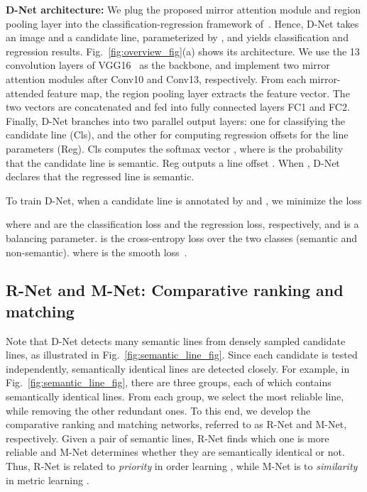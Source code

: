 \documentclass[runningheads]{llncs}
\begin{document}
\noindent\textbf{D-Net architecture:} We plug the proposed mirror attention module and region pooling layer into the classification-regression framework of~\cite{lee2017}. Hence, D-Net takes an image and a candidate line, parameterized by , and yields classification and regression results. Fig.~\ref{fig:overview_fig}(a) shows its architecture. We use the 13 convolution layers of VGG16~\cite{Simonyan2015} as the backbone, and implement two mirror attention modules after Conv10 and Conv13, respectively. From each mirror-attended feature map, the region pooling layer extracts the feature vector. The two vectors are concatenated and fed into fully connected layers FC1 and FC2. Finally, D-Net branches into two parallel output layers: one for classifying the candidate line (Cls), and the other for computing regression offsets for the line parameters (Reg). Cls computes the softmax vector , where  is the probability that the candidate line  is semantic. Reg outputs a line offset . When , D-Net declares that the regressed line  is semantic.

To train D-Net, when a candidate line is annotated by  and , we minimize the loss

where  and  are the classification loss and the regression loss, respectively, and  is a balancing parameter.  is the cross-entropy loss over the two classes (semantic and non-semantic).  where  is the smooth  loss~\cite{girshick2015fast}.


\subsection{R-Net and M-Net: Comparative ranking and matching}
\label{ssec:CRM}

Note that D-Net detects many semantic lines from densely sampled candidate lines, as illustrated in Fig.~\ref{fig:semantic_line_fig}. Since each candidate is tested independently, semantically identical lines are detected closely. For example, in Fig.~\ref{fig:semantic_line_fig}, there are three groups, each of which contains semantically identical lines. From each group, we select the most reliable line, while removing the other redundant ones. To this end, we develop the comparative ranking and matching networks, referred to as R-Net and M-Net, respectively. Given a pair of semantic lines, R-Net finds which one is more reliable and M-Net determines whether they are semantically identical or not. Thus, R-Net is related to \textit{priority} in order learning \cite{lim2020}, while M-Net is to \textit{similarity} in metric learning \cite{sohn2016,oh2016}.
\end{document}

